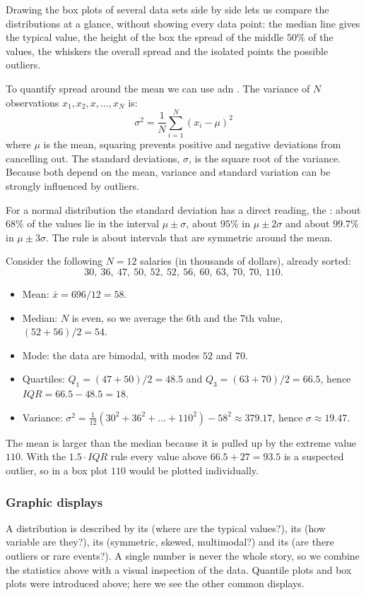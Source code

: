 Drawing the box plots of several data sets side by side lets us compare the distributions at a glance, without showing every data point: the median line gives the typical value, the height of the box the spread of the middle $50\%$ of the values, the whiskers the overall spread and the isolated points the possible outliers.

To quantify spread around the mean we can use  adn . The variance of $N$ observations $x_1,x_2,x,\dots,x_N$ is:
\[
    \sigma^2 = \frac{1}{N} \sum_{i=1}^{N}(x_i - \mu)^2
\]
where $\mu$ is the mean, squaring prevents positive and negative deviations from cancelling out. The standard deviations, $\sigma$, is the square root of the variance. Because both depend on the mean, variance and standard variation can be strongly influenced by outliers.

For a normal distribution the standard deviation has a direct reading, the : about $68\%$ of the values lie in the interval $\mu\pm\sigma$, about $95\%$ in $\mu\pm2\sigma$ and about $99.7\%$ in $\mu\pm3\sigma$. The rule is about intervals that are symmetric around the mean.

\begin{example}
Consider the following $N=12$ salaries (in thousands of dollars), already sorted:
\[
    30,\ 36,\ 47,\ 50,\ 52,\ 52,\ 56,\ 60,\ 63,\ 70,\ 70,\ 110.
\]
\begin{itemize}
    \item Mean: $\bar{x}=696/12=58$.
    \item Median: $N$ is even, so we average the 6th and the 7th value, $(52+56)/2=54$.
    \item Mode: the data are bimodal, with modes $52$ and $70$.
    \item Quartiles: $Q_1=(47+50)/2=48.5$ and $Q_3=(63+70)/2=66.5$, hence $\mathit{IQR}=66.5-48.5=18$.
    \item Variance: $\sigma^2=\frac{1}{12}\left(30^2+36^2+\dots+110^2\right)-58^2\approx 379.17$, hence $\sigma\approx 19.47$.
\end{itemize}
The mean is larger than the median because it is pulled up by the extreme value $110$. With the $1.5\cdot\mathit{IQR}$ rule every value above $66.5+27=93.5$ is a suspected outlier, so in a box plot $110$ would be plotted individually.
\end{example}

\subsubsection{Graphic displays}
A distribution is described by its  (where are the typical values?), its  (how variable are they?), its  (symmetric, skewed, multimodal?) and its  (are there outliers or rare events?). A single number is never the whole story, so we combine the statistics above with a visual inspection of the data. Quantile plots and box plots were introduced above; here we see the other common displays.

